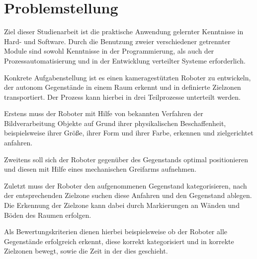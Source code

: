\chapter{Problemstellung}
\label{cha:Problemstellung}

Ziel dieser Studienarbeit ist die praktische Anwendung gelernter Kenntnisse in Hard- und Software. Durch die Benutzung zweier verschiedener getrennter Module sind sowohl Kenntnisse in der Programmierung, als auch der Prozessautomatisierung und in der Entwicklung verteilter Systeme erforderlich.

Konkrete Aufgabenstellung ist es einen kameragestützten Roboter zu entwickeln, der autonom Gegenstände in einem Raum erkennt und in definierte Zielzonen transportiert. Der Prozess kann hierbei in drei Teilprozesse unterteilt werden. 

Erstens muss der Roboter mit Hilfe von bekannten Verfahren der Bildverarbeitung Objekte auf Grund ihrer physikalischen Beschaffenheit, beispielsweise ihrer Größe, ihrer Form und ihrer Farbe, erkennen und zielgerichtet anfahren.

Zweitens soll sich der Roboter gegenüber des Gegenstands optimal positionieren und diesen mit Hilfe eines mechanischen Greifarms aufnehmen.

Zuletzt muss der Roboter den aufgenommenen Gegenstand kategorisieren, nach der entsprechenden Zielzone suchen diese Anfahren und den Gegenstand ablegen. Die Erkennung der Zielzone kann dabei durch Markierungen an Wänden und Böden des Raumen erfolgen.

Als Bewertungskriterien dienen hierbei beispielsweise ob der Roboter alle Gegenstände erfolgreich erkennt, diese korrekt kategorisiert und in korrekte Zielzonen bewegt, sowie die Zeit in der dies geschieht.